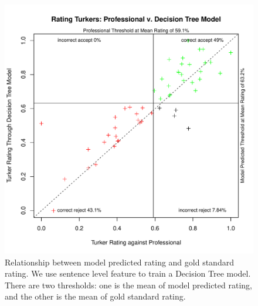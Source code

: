 \documentclass[11pt]{article}
\begin{document}
\begin{figure}[htbp]
  \centering
  \includegraphics[width=\linewidth]{Senfeature/rrankingsenfeatureDT2}
  \caption{Relationship between model predicted rating and gold standard rating. We use sentence level feature to train a Decision Tree model. There are two thresholds: one is the mean of model predicted rating, and the other is the mean of gold standard rating.}
    \label{fdtsenrrating2}
\end{figure}
\end{document}
